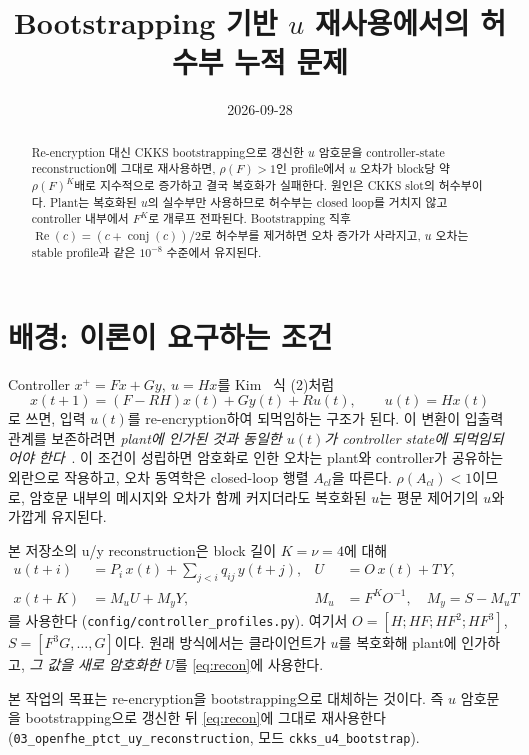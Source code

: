 \documentclass[11pt,a4paper]{article}
\title{Bootstrapping 기반 $u$ 재사용에서의 허수부 누적 문제}
\author{}
\date{2026-09-28}
\renewcommand{\Re}{\operatorname{Re}}
\newcommand{\conj}{\operatorname{conj}}
\begin{document}
\maketitle

\begin{abstract}
Re-encryption 대신 CKKS bootstrapping으로 갱신한 $u$ 암호문을 controller-state reconstruction에 그대로 재사용하면, $\rho(F)>1$인 profile에서 $u$ 오차가 block당 약 $\rho(F)^K$배로 지수적으로 증가하고 결국 복호화가 실패한다.
원인은 CKKS slot의 허수부이다.
Plant는 복호화된 $u$의 실수부만 사용하므로 허수부는 closed loop를 거치지 않고 controller 내부에서 $F^K$로 개루프 전파된다.
Bootstrapping 직후 $\Re(c)=(c+\conj(c))/2$로 허수부를 제거하면 오차 증가가 사라지고, $u$ 오차는 stable profile과 같은 $10^{-8}$ 수준에서 유지된다.
\end{abstract}

\section{배경: 이론이 요구하는 조건}

Controller $x^+=Fx+Gy,\ u=Hx$를 Kim~\cite{kim} 식 (2)처럼
\begin{equation}
x(t+1)=(F-RH)x(t)+Gy(t)+Ru(t),\qquad u(t)=Hx(t)
\label{eq:tac}
\end{equation}
로 쓰면, 입력 $u(t)$를 re-encryption하여 되먹임하는 구조가 된다.
이 변환이 입출력 관계를 보존하려면 \emph{plant에 인가된 것과 동일한 $u(t)$가 controller state에 되먹임되어야 한다}~\cite[Sec.~I-A]{kim}.
이 조건이 성립하면 암호화로 인한 오차는 plant와 controller가 공유하는 외란으로 작용하고, 오차 동역학은 closed-loop 행렬 $A_{cl}$을 따른다.
$\rho(A_{cl})<1$이므로, 암호문 내부의 메시지와 오차가 함께 커지더라도 복호화된 $u$는 평문 제어기의 $u$와 가깝게 유지된다.

본 저장소의 u/y reconstruction은 block 길이 $K=\nu=4$에 대해
\begin{align}
u(t+i) &= P_i\,x(t)+\sum_{j<i} q_{ij}\,y(t+j), & U &= O\,x(t)+T\,Y, \label{eq:u}\\
x(t+K) &= M_u U + M_y Y, & M_u &= F^K O^{-1},\quad M_y=S-M_uT \label{eq:recon}
\end{align}
를 사용한다 (\texttt{config/controller\_profiles.py}).
여기서 $O=[H;HF;HF^2;HF^3]$, $S=[F^{3}G,\dots,G]$이다.
원래 방식에서는 클라이언트가 $u$를 복호화해 plant에 인가하고, \emph{그 값을 새로 암호화한} $U$를 \eqref{eq:recon}에 사용한다.

본 작업의 목표는 re-encryption을 bootstrapping으로 대체하는 것이다.
즉 $u$ 암호문을 bootstrapping으로 갱신한 뒤 \eqref{eq:recon}에 그대로 재사용한다
(\texttt{03\_openfhe\_ptct\_uy\_reconstruction}, 모드 \texttt{ckks\_u4\_bootstrap}).
\end{document}
